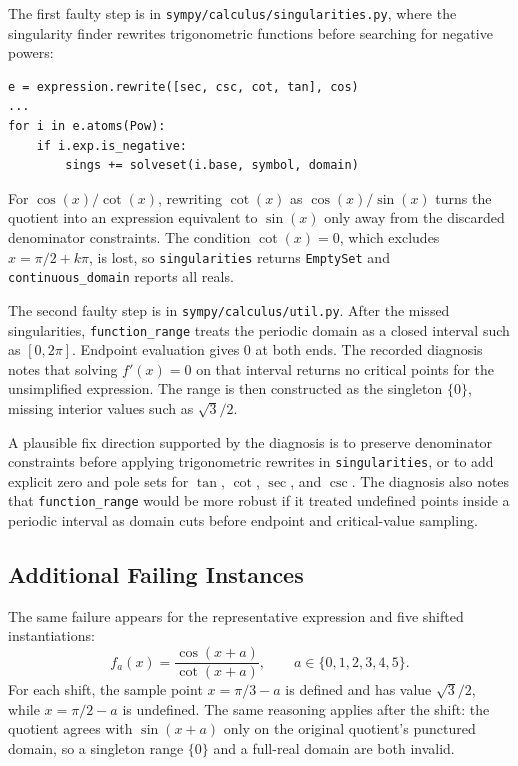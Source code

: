 \documentclass[11pt]{article}
\begin{document}
The first faulty step is in \nolinkurl{sympy/calculus/singularities.py}, where the singularity finder rewrites trigonometric functions before searching for negative powers:

\begin{lstlisting}[style=bugpython]
e = expression.rewrite([sec, csc, cot, tan], cos)
...
for i in e.atoms(Pow):
    if i.exp.is_negative:
        sings += solveset(i.base, symbol, domain)
\end{lstlisting}

For \(\cos(x)/\cot(x)\), rewriting \(\cot(x)\) as \(\cos(x)/\sin(x)\) turns the quotient into an expression equivalent to \(\sin(x)\) only away from the discarded denominator constraints. The condition \(\cot(x)=0\), which excludes \(x=\pi/2+k\pi\), is lost, so \texttt{singularities} returns \texttt{EmptySet} and \texttt{continuous\_domain} reports all reals.

\begin{sloppypar}
The second faulty step is in \nolinkurl{sympy/calculus/util.py}. After the missed singularities, \texttt{function\_range} treats the periodic domain as a closed interval such as \([0,2\pi]\). Endpoint evaluation gives \(0\) at both ends. The recorded diagnosis notes that solving \(f'(x)=0\) on that interval returns no critical points for the unsimplified expression. The range is then constructed as the singleton \(\{0\}\), missing interior values such as \(\sqrt{3}/2\).
\end{sloppypar}

A plausible fix direction supported by the diagnosis is to preserve denominator constraints before applying trigonometric rewrites in \texttt{singularities}, or to add explicit zero and pole sets for \(\tan\), \(\cot\), \(\sec\), and \(\csc\). The diagnosis also notes that \texttt{function\_range} would be more robust if it treated undefined points inside a periodic interval as domain cuts before endpoint and critical-value sampling.

\subsection{Additional Failing Instances}

The same failure appears for the representative expression and five shifted instantiations:
\[
  f_a(x)=\frac{\cos(x+a)}{\cot(x+a)}, \qquad a\in\{0,1,2,3,4,5\}.
\]
For each shift, the sample point \(x=\pi/3-a\) is defined and has value \(\sqrt{3}/2\), while \(x=\pi/2-a\) is undefined. The same reasoning applies after the shift: the quotient agrees with \(\sin(x+a)\) only on the original quotient's punctured domain, so a singleton range \(\{0\}\) and a full-real domain are both invalid.
\end{document}
